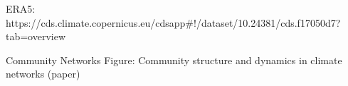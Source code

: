 ERA5:
https://cds.climate.copernicus.eu/cdsapp#!/dataset/10.24381/cds.f17050d7?tab=overview

Community Networks Figure:
Community structure and dynamics in climate networks (paper)